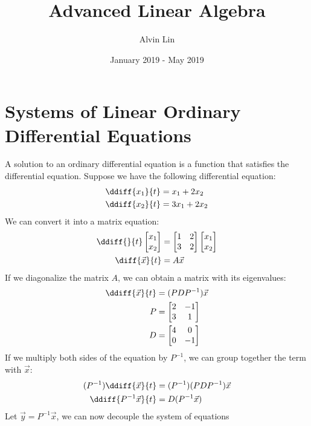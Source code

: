 \documentclass{math}
\title{Advanced Linear Algebra}
\author{Alvin Lin}
\date{January 2019 - May 2019}
\begin{document}
\maketitle

\section*{Systems of Linear Ordinary Differential Equations}
A solution to an ordinary differential equation is a function that satisfies
the differential equation. Suppose we have the following differential equation:
\begin{align*}
  \ddiff{x_1}{t} &= x_1+2x_2 \\
  \ddiff{x_2}{t} &= 3x_1+2x_2
\end{align*}
We can convert it into a matrix equation:
\begin{align*}
  \ddiff{}{t}\begin{bmatrix}x_1 \\ x_2\end{bmatrix} &= \begin{bmatrix}
    1 & 2 \\
    3 & 2
  \end{bmatrix}\begin{bmatrix}x_1 \\ x_2\end{bmatrix} \\
  \diff{\vec{x}}{t} &= A\vec{x}
\end{align*}
If we diagonalize the matrix \( A \), we can obtain a matrix with its
eigenvalues:
\begin{align*}
  \ddiff{\vec{x}}{t} &= (PDP^{-1})\vec{x} \\
  P &= \begin{bmatrix}
    2 & -1 \\
    3 & 1
  \end{bmatrix} \\
  D &= \begin{bmatrix}
    4 & 0 \\
    0 & -1
  \end{bmatrix}
\end{align*}
If we multiply both sides of the equation by \( P^{-1} \), we can group together
the term with \( \vec{x} \):
\begin{align*}
  (P^{-1})\ddiff{\vec{x}}{t} &= (P^{-1})(PDP^{-1})\vec{x} \\
  \ddiff{P^{-1}\vec{x}}{t} &= D(P^{-1}\vec{x})
\end{align*}
Let \( \vec{y} = P^{-1}\vec{x} \), we can now decouple the system of equations
\end{document}

